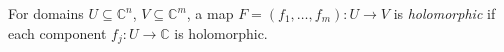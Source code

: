 
For domains $U\subseteq\mathbb C^n$, $V\subseteq\mathbb C^m$, a map $F=(f_1,\ldots,f_m):U\to V$ is \emph{holomorphic} if each component $f_j:U\to\mathbb C$ is holomorphic.
